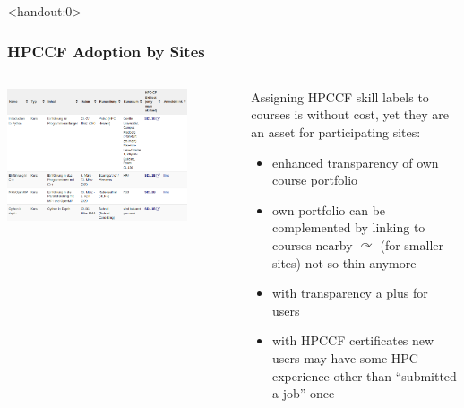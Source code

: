 \begin{frame}<handout:0>
  \frametitle{HPCCF Adoption by Sites}
  \begin{columns}
   \begin{column}{0.5\textwidth}
    \centering
    \includegraphics[width=0.8\textwidth]{images/linking_skills}\\
   \end{column}
   \begin{column}{0.5\textwidth}
     Assigning HPCCF skill labels to courses is without cost, yet they are an asset for participating sites:
     \begin{itemize}
      \item enhanced transparency of own course portfolio
      \item own portfolio can be complemented by linking to courses nearby $\curvearrowright$ (for smaller sites) not so thin anymore
      \item with transparency a plus for users
      \item with HPCCF certificates new users may have some HPC experience other than ``submitted a job'' once
     \end{itemize}
   \end{column}
  \end{columns}
\end{frame}


